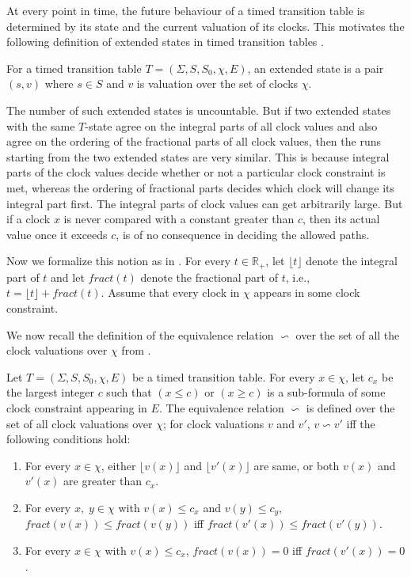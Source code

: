 At every point in time, the future behaviour of a timed transition table is determined by its state and the current valuation of its clocks. This motivates the following definition of extended states in timed transition tables \cite{1}.

\begin{definition}
For a timed transition table $T = (\Sigma, S, S_{0}, \chi, E)$, an extended state is a pair $(s, v)$ where $s \in S$ and $v$ is valuation over the set of clocks $\chi$.
\end{definition}

The number of such extended states is uncountable. But if two extended states with the same $T$-state agree on the integral parts of all clock values and also agree on the ordering of the fractional parts of all clock values, then the runs starting from the two extended states are very similar. This is because integral parts of the clock values decide whether or not a particular clock constraint is met, whereas the ordering of fractional parts decides which clock will change its integral part first. The integral parts of clock values can get arbitrarily large. But if a clock $x$ is never compared with a constant greater than $c$, then its actual value once it exceeds $c$, is of no consequence in deciding the allowed paths.

Now we formalize this notion as in \cite{1}. For every $t \in \mathbb{R}_{+}$, let $\lfloor  t \rfloor$ denote the integral part of $t$ and let $fract(t)$ denote the fractional part of $t$, i.e., $t = \lfloor t \rfloor + fract(t)$. Assume that every clock in $\chi$ appears in some clock constraint.

We now recall the definition of the equivalence relation $\backsim$ over the set of all the clock valuations over $\chi$ from \cite{1}.

\begin{definition}
Let $T = (\Sigma, S, S_{0}, \chi, E)$ be a timed transition table. For every $x \in \chi$, let $c_{x}$ be the largest integer $c$ such that $(x \leq c)$ or $(x \geq c)$ is a sub-formula of some clock constraint appearing in $E$. The equivalence relation $\backsim$ is defined over the set of all clock valuations over $\chi$; for clock valuations $v$ and $v'$, $v \backsim v'$ iff the following conditions hold:
\begin{enumerate}
\item For every $x \in \chi$, either $\lfloor v(x) \rfloor$ and $\lfloor v'(x) \rfloor$ are same, or both $v(x)$ and $v'(x)$ are greater than $c_{x}$.
\item For every $x, \; y \in \chi$ with $v(x) \leq c_{x}$ and $v(y) \leq c_{y}$, $fract(v(x)) \leq fract(v(y))$ iff $fract(v'(x)) \leq fract(v'(y))$.
\item For every $x \in \chi$ with $v(x) \leq c_{x}$, $fract(v(x)) = 0$ iff $fract(v'(x)) = 0$.
\end{enumerate}
\end{definition}

